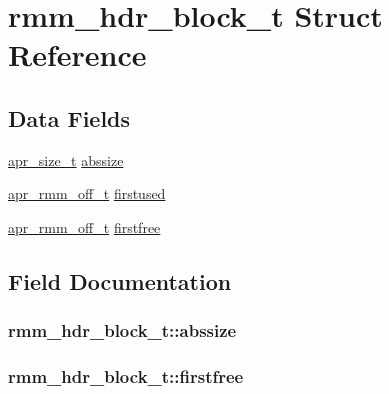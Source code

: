 \hypertarget{structrmm__hdr__block__t}{}\section{rmm\+\_\+hdr\+\_\+block\+\_\+t Struct Reference}
\label{structrmm__hdr__block__t}
\subsection*{Data Fields}
\begin{DoxyCompactItemize}
\item 
\hyperlink{group__apr__platform_gaaa72b2253f6f3032cefea5712a27540e}{apr\+\_\+size\+\_\+t} \hyperlink{structrmm__hdr__block__t_a61398b3932e07c908df5041bd50be5d4}{abssize}
\item 
\hyperlink{group__APR__Util__RMM_ga70b508c81a0bc75350efdefb3410af12}{apr\+\_\+rmm\+\_\+off\+\_\+t} \hyperlink{structrmm__hdr__block__t_ab8743c7d906b6f3b8592c46a22a843c2}{firstused}
\item 
\hyperlink{group__APR__Util__RMM_ga70b508c81a0bc75350efdefb3410af12}{apr\+\_\+rmm\+\_\+off\+\_\+t} \hyperlink{structrmm__hdr__block__t_adb7cb8fd5f699b9024977524fd2a1ddd}{firstfree}
\end{DoxyCompactItemize}


\subsection{Field Documentation}
\subsubsection[{\texorpdfstring{abssize}{abssize}}]{ rmm\+\_\+hdr\+\_\+block\+\_\+t\+::abssize}\hypertarget{structrmm__hdr__block__t_a61398b3932e07c908df5041bd50be5d4}{}\label{structrmm__hdr__block__t_a61398b3932e07c908df5041bd50be5d4}
\subsubsection[{\texorpdfstring{firstfree}{firstfree}}]{ rmm\+\_\+hdr\+\_\+block\+\_\+t\+::firstfree}\hypertarget{structrmm__hdr__block__t_adb7cb8fd5f699b9024977524fd2a1ddd}{}\label{structrmm__hdr__block__t_adb7cb8fd5f699b9024977524fd2a1ddd}
